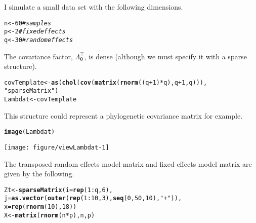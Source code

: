 \documentclass[12pt]{article}\usepackage[]{graphicx}\usepackage[]{color}
\makeatletter
\def\maxwidth{ %
  \ifdim\Gin@nat@width>\linewidth
    \linewidth
  \else
    \Gin@nat@width
  \fi
}
\newcommand{\hlnum}[1]{\textcolor[rgb]{0.686,0.059,0.569}{#1}}%
\newcommand{\hlstr}[1]{\textcolor[rgb]{0.192,0.494,0.8}{#1}}%
\newcommand{\hlcom}[1]{\textcolor[rgb]{0.678,0.584,0.686}{\textit{#1}}}%
\newcommand{\hlopt}[1]{\textcolor[rgb]{0,0,0}{#1}}%
\newcommand{\hlstd}[1]{\textcolor[rgb]{0.345,0.345,0.345}{#1}}%
\newcommand{\hlkwb}[1]{\textcolor[rgb]{0.69,0.353,0.396}{#1}}%
\newcommand{\hlkwc}[1]{\textcolor[rgb]{0.333,0.667,0.333}{#1}}%
\newcommand{\hlkwd}[1]{\textcolor[rgb]{0.737,0.353,0.396}{\textbf{#1}}}%
\newenvironment{kframe}{%
 \def\at@end@of@kframe{}%
 \ifinner\ifhmode%
  \def\at@end@of@kframe{\end{minipage}}%
  \begin{minipage}{\columnwidth}%
 \fi\fi%
 \def\FrameCommand##1{\hskip\@totalleftmargin \hskip-\fboxsep
 \colorbox{shadecolor}{##1}\hskip-\fboxsep
     \hskip-\linewidth \hskip-\@totalleftmargin \hskip\columnwidth}%
 \MakeFramed {\advance\hsize-\width
   \@totalleftmargin\z@ \linewidth\hsize
   \@setminipage}}%
 {\par\unskip\endMakeFramed%
 \at@end@of@kframe}
\newenvironment{knitrout}{}{} %
\makeatother
\begin{document}
I simulate a small data set with the following dimensions.
\begin{knitrout}
\color{fgcolor}\begin{kframe}
\begin{alltt}
\hlstd{n} \hlkwb{<-} \hlnum{60} \hlcom{# samples }
\hlstd{p} \hlkwb{<-} \hlnum{2}  \hlcom{# fixed effects}
\hlstd{q} \hlkwb{<-} \hlnum{30} \hlcom{# random effects}
\end{alltt}
\end{kframe}
\end{knitrout}
The covariance factor, $\Lambda_{\bm\theta}^\top$, is dense (although
we must specify it with a sparse structure).
\begin{knitrout}
\color{fgcolor}\begin{kframe}
\begin{alltt}
\hlstd{covTemplate} \hlkwb{<-} \hlkwd{as}\hlstd{(}\hlkwd{chol}\hlstd{(}\hlkwd{cov}\hlstd{(}\hlkwd{matrix}\hlstd{(}\hlkwd{rnorm}\hlstd{((q}\hlopt{+}\hlnum{1}\hlstd{)}\hlopt{*}\hlstd{q), q} \hlopt{+} \hlnum{1}\hlstd{, q))),}
                  \hlstr{"sparseMatrix"}\hlstd{)}
\hlstd{Lambdat} \hlkwb{<-} \hlstd{covTemplate}
\end{alltt}
\end{kframe}
\end{knitrout}
This structure could represent a phylogenetic covariance matrix for
example.
\begin{knitrout}
\color{fgcolor}\begin{kframe}
\begin{alltt}
\hlkwd{image}\hlstd{(Lambdat)}
\end{alltt}
\end{kframe}
\texttt{[image: figure/viewLambdat-1]} 

\end{knitrout}
The transposed random effects model matrix and fixed effects model
matrix are given by the following.
\begin{knitrout}
\color{fgcolor}\begin{kframe}
\begin{alltt}
\hlstd{Zt} \hlkwb{<-} \hlkwd{sparseMatrix}\hlstd{(}\hlkwc{i} \hlstd{=} \hlkwd{rep}\hlstd{(}\hlnum{1}\hlopt{:}\hlstd{q,} \hlnum{6}\hlstd{),}
                   \hlkwc{j} \hlstd{=} \hlkwd{as.vector}\hlstd{(}\hlkwd{outer}\hlstd{(}\hlkwd{rep}\hlstd{(}\hlnum{1}\hlopt{:}\hlnum{10}\hlstd{,} \hlnum{3}\hlstd{),} \hlkwd{seq}\hlstd{(}\hlnum{0}\hlstd{,} \hlnum{50}\hlstd{,} \hlnum{10}\hlstd{),} \hlstr{"+"}\hlstd{)),}
                   \hlkwc{x} \hlstd{=} \hlkwd{rep}\hlstd{(}\hlkwd{rnorm}\hlstd{(}\hlnum{10}\hlstd{),} \hlnum{18}\hlstd{))}
\hlstd{X} \hlkwb{<-} \hlkwd{matrix}\hlstd{(}\hlkwd{rnorm}\hlstd{(n} \hlopt{*} \hlstd{p), n, p)}
\end{alltt}
\end{kframe}
\end{knitrout}
\end{document}
